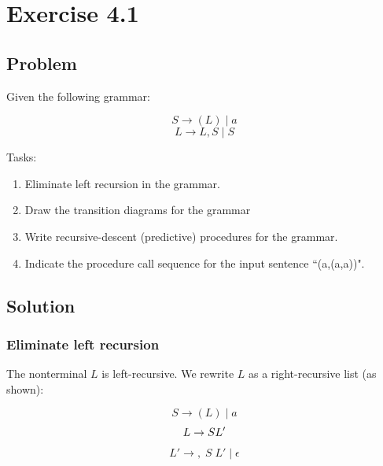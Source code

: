 

\chapter{Exercise 4.1}

\section{Problem}

Given the following grammar:

\[
S \to (L) \;|\; a
\]
\[
L \to L , S \;|\; S
\]

Tasks:
\begin{enumerate}
	\item Eliminate left recursion in the grammar.
	\item Draw the transition diagrams for the grammar
	\item Write recursive-descent (predictive) procedures for the grammar.
	\item Indicate the procedure call sequence for the input sentence ``(a,(a,a))".
\end{enumerate}

\section{Solution}

\subsection{Eliminate left recursion}

The nonterminal $L$ is left-recursive. We rewrite $L$ as a right-recursive list (as shown):

\[
S \to (L) \;|\; a
\]
\[
L \to S L' \\
\]
\[
L' \to ,\;S\;L' \;|\; \epsilon
\]

